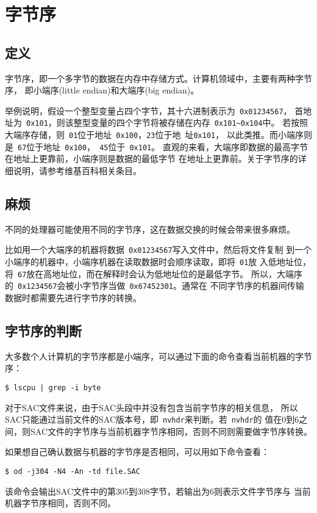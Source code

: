 \section{字节序}
\label{sec:endian}
\subsection{定义}
字节序，即一个多字节的数据在内存中存储方式。计算机领域中，主要有两种字节序，
即小端序(little endian)和大端序(big endian)。

举例说明，假设一个整型变量占四个字节，其十六进制表示为~\verb+0x01234567+，
首地址为~\verb+0x101+，则该整型变量的四个字节将被存储在内存~\verb+0x101~0x104+中。
若按照大端序存储，则~\verb+01+位于地址~\verb+0x100+，\verb+23+位于地~址\verb+0x101+，
以此类推。而小端序则是~\verb+67+位于地址~\verb+0x100+，~\verb+45+位于~\verb+0x101+。
直观的来看，大端序即数据的最高字节在地址上更靠前，小端序则是数据的最低字节
在地址上更靠前。关于字节序的详细说明，请参考维基百科相关条目。

\subsection{麻烦}
不同的处理器可能使用不同的字节序，这在数据交换的时候会带来很多麻烦。

比如用一个大端序的机器将数据~\verb+0x01234567+写入文件中，然后将文件复制
到一个小端序的机器中，小端序机器在读取数据时会顺序读取，即将~\verb+01+放
入低地址位，将~\verb+67+放在高地址位，而在解释时会认为低地址位的是最低字节。
所以，大端序的~\verb+0x1234567+会被小字节序当做~\verb+0x67452301+。通常在
不同字节序的机器间传输数据时都需要先进行字节序的转换。

\subsection{字节序的判断}
大多数个人计算机的字节序都是小端序，可以通过下面的命令查看当前机器的字节序：
\begin{verbatim}
$ lscpu | grep -i byte
\end{verbatim}

对于SAC文件来说，由于SAC头段中并没有包含当前字节序的相关信息，
所以SAC只能通过当前文件的SAC版本号，即~\verb+nvhdr+来判断。若~\verb+nvhdr+的
值在0到6之间，则SAC文件的字节序与当前机器字节序相同，否则不同则需要做字节序转换。

如果想自己确认数据与机器的字节序是否相同，可以用如下命令查看：
\begin{verbatim}
$ od -j304 -N4 -An -td file.SAC
\end{verbatim}
该命令会输出SAC文件中的第305到308字节，若输出为6则表示文件字节序与
当前机器字节序相同，否则不同。


